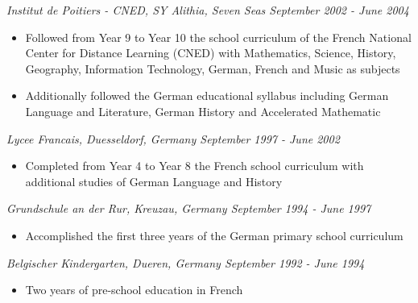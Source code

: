 \documentclass[margin]{res}
\begin{document}
\begin{resume}
\begin{itemize}
  \end{itemize}
  {\it Institut de Poitiers - CNED, SY Alithia, Seven Seas \hfill September 2002 - June 2004}
  \begin{itemize} \itemsep -0.5pt  %
  \item Followed from Year 9 to Year 10 the school curriculum of the French National Center for Distance Learning (CNED) with Mathematics, Science, History, Geography, Information Technology, German, French and Music as subjects
  \item Additionally followed the German educational syllabus including German Language and Literature, German History and Accelerated Mathematic
  \end{itemize}
  {\it Lycee Francais, Duesseldorf, Germany \hfill September 1997 - June 2002}
  \begin{itemize} \itemsep -0.5pt  %
  \item Completed from Year 4 to Year 8 the French school curriculum with additional studies of German Language and History
  \end{itemize}
  {\it Grundschule an der Rur, Kreuzau, Germany \hfill September 1994 - June 1997}
  \begin{itemize} \itemsep -0.5pt  %
  \item Accomplished the first three years of the German primary school curriculum
  \end{itemize}
  {\it Belgischer Kindergarten, Dueren, Germany \hfill September 1992 - June 1994}
  \begin{itemize} \itemsep -0.5pt  %
  \item Two years of pre-school education in French
  \end{itemize}

\newpage


\end{resume}
\end{document}
